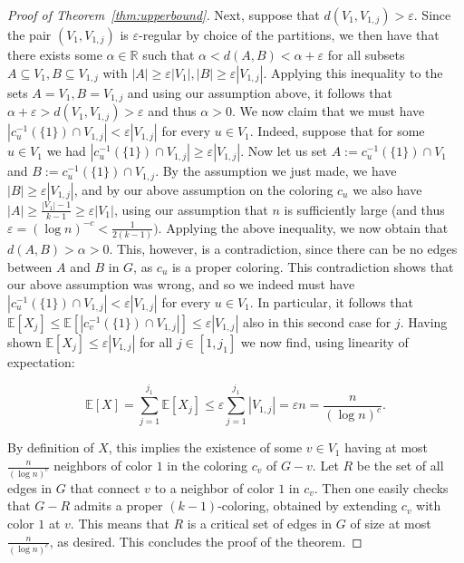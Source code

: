 \documentclass[a4paper,10pt,hidelinks]{amsart}
\theoremstyle{definition}
\begin{document}
\begin{proof}[Proof of Theorem~\ref{thm:upperbound}]
Next, suppose that $d(V_1, V_{1,j})>\varepsilon$. Since the pair $(V_1,V_{1,j})$ is $\varepsilon$-regular by choice of the partitions, we then have that there exists some $\alpha\in \mathbb{R}$ such that $\alpha<d(A,B)<\alpha+\varepsilon$ for all subsets $A\subseteq V_1, B\subseteq V_{1,j}$ with $|A|\ge \varepsilon |V_1|, |B|\ge \varepsilon |V_{1,j}|$. Applying this inequality to the sets $A=V_1, B=V_{1,j}$ and using our assumption above, it follows that $\alpha+\varepsilon>d(V_1, V_{1,j})>\varepsilon$ and thus $\alpha>0$. We now claim that we must have $|c_u^{-1}(\{1\})\cap V_{1,j}|< \varepsilon |V_{1,j}|$ for every $u\in V_1$. Indeed, suppose that for some $u\in V_1$ we had $|c_u^{-1}(\{1\})\cap V_{1,j}|\ge \varepsilon |V_{1,j}|$. Now let us set $A:=c_u^{-1}(\{1\})\cap V_1$ and $B:=c_u^{-1}(\{1\})\cap V_{1,j}$. By the assumption we just made, we have $|B|\ge \varepsilon |V_{1,j}|$, and by our above assumption on the coloring $c_u$ we also have $|A|\ge \frac{|V_1|-1}{k-1}\ge \varepsilon |V_1|$, using our assumption that $n$ is sufficiently large (and thus $\varepsilon=(\log n)^{-c}<\frac{1}{2(k-1)})$. Applying the above inequality, we now obtain that $d(A,B)>\alpha>0$. This, however, is a contradiction, since there can be no edges between $A$ and $B$ in $G$, as $c_u$ is a proper coloring. This contradiction shows that our above assumption was wrong, and so we indeed must have $|c_u^{-1}(\{1\})\cap V_{1,j}|< \varepsilon |V_{1,j}|$ for every $u\in V_1$. In particular, it follows that $\mathbb{E}[X_j]\le \mathbb{E}[|c_v^{-1}(\{1\})\cap V_{1,j}|]\le \varepsilon |V_{1,j}|$ also in this second case for $j$. Having shown $\mathbb{E}[X_j]\le \varepsilon |V_{1,j}|$ for all $j\in [1,j_1]$ we now find, using linearity of expectation:

$$\mathbb{E}[X]= \sum_{j=1}^{j_1}\mathbb{E}[X_j]\le \varepsilon \sum_{j=1}^{j_1}{|V_{1,j}|}=\varepsilon n=\frac{n}{(\log n)^c}.$$

By definition of $X$, this implies the existence of some $v\in V_1$ having at most $\frac{n}{(\log n)^c}$ neighbors of color $1$ in the coloring $c_v$ of $G-v$. Let $R$ be the set of all edges in $G$ that connect $v$ to a neighbor of color $1$ in $c_v$. Then one easily checks that $G-R$ admits a proper $(k-1)$-coloring, obtained by extending $c_v$ with color $1$ at $v$. This means that $R$ is a critical set of edges in $G$ of size at most $\frac{n}{(\log n)^c}$, as desired. This concludes the proof of the theorem.
\end{proof}
\end{document}
